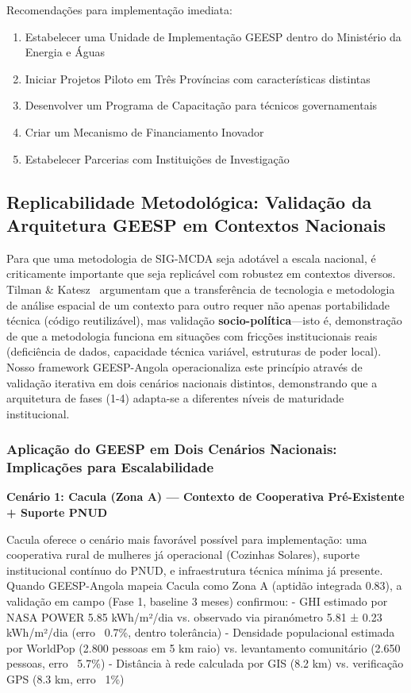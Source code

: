 \documentclass[12pt, a4paper]{article}
\begin{document}
{{{{{{{{{{{{Recomendações para implementação imediata:
\begin{enumerate}
\item Estabelecer uma Unidade de Implementação GEESP dentro do Ministério da Energia e Águas
\item Iniciar Projetos Piloto em Três Províncias com características distintas
\item Desenvolver um Programa de Capacitação para técnicos governamentais
\item Criar um Mecanismo de Financiamento Inovador
\item Estabelecer Parcerias com Instituições de Investigação
\end{enumerate}

\subsection{Replicabilidade Metodológica: Validação da Arquitetura GEESP em Contextos Nacionais}

Para que uma metodologia de SIG-MCDA seja adotável a escala nacional, é criticamente importante que seja replicável com robustez em contextos diversos. Tilman \& Katesz~\citep{Tilman2002} argumentam que a transferência de tecnologia e metodologia de análise espacial de um contexto para outro requer não apenas portabilidade técnica (código reutilizável), mas validação \textbf{socio-política}---isto é, demonstração de que a metodologia funciona em situações com fricções institucionais reais (deficiência de dados, capacidade técnica variável, estruturas de poder local). Nosso framework GEESP-Angola operacionaliza este princípio através de validação iterativa em dois cenários nacionais distintos, demonstrando que a arquitetura de fases (1-4) adapta-se a diferentes níveis de maturidade institucional.

\subsubsection{Aplicação do GEESP em Dois Cenários Nacionais: Implicações para Escalabilidade}

\textbf{Cenário 1: Cacula (Zona A) — Contexto de Cooperativa Pré-Existente + Suporte PNUD}

Cacula oferece o cenário mais favorável possível para implementação: uma cooperativa rural de mulheres já operacional (Cozinhas Solares), suporte institucional contínuo do PNUD, e infraestrutura técnica mínima já presente. Quando GEESP-Angola mapeia Cacula como Zona A (aptidão integrada 0.83), a validação em campo (Fase 1, baseline 3 meses) confirmou:
- GHI estimado por NASA POWER 5.85 kWh/m²/dia vs. observado via piranómetro 5.81 ± 0.23 kWh/m²/dia (erro ~0.7\%, dentro tolerância)
- Densidade populacional estimada por WorldPop (2.800 pessoas em 5 km raio) vs. levantamento comunitário (2.650 pessoas, erro ~5.7\%)
- Distância à rede calculada por GIS (8.2 km) vs. verificação GPS (8.3 km, erro ~1\%)

}}}}}}}}}}}}
\end{document}
